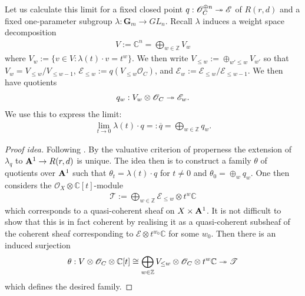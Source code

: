 \documentclass[12pt]{ociamthesis}  %
\begin{document}
\begin{example}\label{ex:lf_limits}
  Let us calculate this limit for a fixed closed point
  $q : \mathscr O^{\oplus n}_C \twoheadrightarrow \mathscr E$ of $R(r,d)$
  and a fixed one-parameter subgroup $\lambda : \mathbf G_m \to GL_n$.
  Recall $\lambda$ induces a weight space decomposition
  \begin{align*}
    V := \mathbb C^n  = \bigoplus_{w\in\mathbb Z} V_w
  \end{align*}
  where $V_w := \{v \in V : \lambda(t)\cdot v = t^w\}$. We then
  write $V_{\leq w} := \oplus_{w'\leq w}V_{w'}$ so that $V_w = V_{\leq w}/V_{\leq w-1}$,
  $\mathscr E_{\leq w} := q(V_{\leq w}\mathscr O_C)$, and
  $\mathscr E_w := \mathscr E_{\leq w}/\mathscr E_{\leq w-1}$.
  We then have quotients
  \begin{align*}
    q_w : V_w\otimes\mathscr O_C \twoheadrightarrow \mathscr E_w.
  \end{align*}
  We use this to express the limit:
  \begin{align*}
    \lim_{t\to 0} \lambda(t)\cdot q =: \overline{q} = \bigoplus_{w\in\mathbb Z} q_w.
  \end{align*}
  \begin{proof}[Proof idea]
    Following \cite[Lemma 4.4.3]{huybrechts2010}.
    By the valuative criterion of properness the extension
    of $\lambda_q$ to $\mathbf{A}^{1}_{}\to R(r,d)$ is unique.
    The idea then is to construct a family $\theta$
    of quotients over $\mathbf{A}^{1}_{}$ such that $\theta_t = \lambda(t)\cdot q$
    for $t\neq 0$ and $\theta_0 = \oplus_w q_w$.
    One then considers the $\mathscr O_X\otimes\mathbb C[t]$-module
    \begin{align*}
      \mathscr T := \bigoplus_{w\in\mathbb Z} \mathscr E_{\leq w}\otimes t^w\mathbb C
    \end{align*}
    which corresponds to a quasi-coherent sheaf on $X\times\mathbf{A}^{1}_{}$.
    It is not difficult to show that this is in fact coherent by
    realising it as a quasi-coherent subsheaf of the coherent sheaf
    corresponding to $\mathscr E\otimes t^{w_0}\mathbb C$ for some $w_0$.
    Then there is an induced surjection
    \begin{align}\label{eq:lf_extension}
      \theta : V\otimes\mathscr O_C \otimes \mathbb C[t]
      \cong\bigoplus_{w\in\mathbb Z} V_{\leq w}\otimes\mathscr O_C\otimes t^w\mathbb C
      \twoheadrightarrow \mathscr T
    \end{align}
    which defines the desired family.
  \end{proof}
\end{example}
\end{document}
